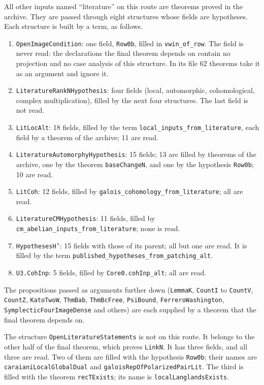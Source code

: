 \documentclass[11pt,letterpaper]{article}
\begin{document}
All other inputs named ``literature'' on this route are theorems proved in the archive. They are passed
through eight structures whose fields are hypotheses. Each structure is built by a term, as follows.
\begin{enumerate}[label=\textup{(\arabic*)},leftmargin=2.4em,itemsep=1pt,topsep=3pt]
\item \texttt{OpenImageCondition}: one field, \texttt{Row0b}, filled in \texttt{vwin\_of\_row}. The field is
never read: the declarations the final theorem depends on contain no projection and no case analysis of
this structure. In its file 62 theorems take it as an argument and ignore it.
\item \texttt{LiteratureRankNHypothesis}: four fields (local, automorphic, cohomological, complex
multiplication), filled by the next four structures. The last field is not read.
\item \texttt{LitLocAlt}: 18 fields, filled by the term \texttt{local\_inputs\_from\_literature}, each
field by a theorem of the archive; 11 are read.
\item \texttt{LiteratureAutomorphyHypothesis}: 15 fields; 13 are filled by theorems of the archive, one by
the theorem \texttt{baseChangeN}, and one by the hypothesis \texttt{Row0b}; 10 are read.
\item \texttt{LitCoh}: 12 fields, filled by \texttt{galois\_cohomology\_from\_literature}; all are read.
\item \texttt{LiteratureCMHypothesis}: 11 fields, filled by
\texttt{cm\_abelian\_inputs\_from\_literature}; none is read.
\item \texttt{HypothesesH'}: 15 fields with those of its parent; all but one are read. It is filled by
the term \texttt{published\_hypotheses\_from\_patching\_alt}.
\item \texttt{U3.CohInp}: 5 fields, filled by \texttt{Core0.cohInp\_alt}; all are read.
\end{enumerate}
The propositions passed as arguments further down (\texttt{LemmaK}, \texttt{CountI} to \texttt{CountV},
\texttt{CountZ}, \texttt{KatoTwoW}, \texttt{ThmBab}, \texttt{ThmBcFree}, \texttt{PsiBound},
\texttt{FerreroWashington}, \texttt{SymplecticFourImageDense} and others) are each supplied by a theorem
that the final theorem depends on. 

The structure \texttt{OpenLiteratureStatements} is not on this route. It belongs to the other half of
the final theorem, which proves \texttt{LinkN}. It has three fields, and all three are read. Two of
them are filled with the hypothesis \texttt{Row0b}; their names are \texttt{caraianiLocalGlobalDual} and
\texttt{galoisRepOfPolarizedPairLit}. The third is filled with the theorem \texttt{recTExists}; its name
is \texttt{localLanglandsExists}.
\end{document}
